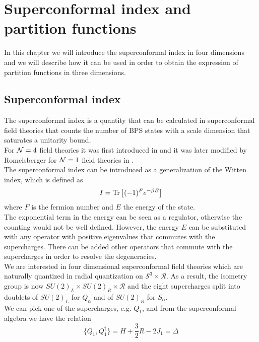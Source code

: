 

\chapter{Superconformal index and partition functions}

In this chapter we will introduce the superconformal index in four dimensions and we will describe how it can be used in order to obtain the expression of partition functions in three dimensions.\\
{\color{red}{ \LARGE Devo Aggiunger qualcosa}}


\section{Superconformal index}
The superconformal index is a quantity that can be calculated in superconformal field theories that counts the number of BPS states with a scale dimension that saturates a unitarity bound.\\
For $\mathcal{N}=4$ field theories it was first introduced in \cite{Kinney:2005ej}
and it was later modified by Romelsberger for $\mathcal{N}=1$ field theories in \cite{Romelsberger:2005eg}.\\
The superconformal index can be introduced as a generalization of the Witten index, which is defined as 
\begin{equation}
I = \mathrm{Tr } \,{ \left[   (-1)^F e^{-\beta E}\right]}
\end{equation}
where $F$ is the fermion number and $E$ the energy of the state.\\
The exponential term in the energy can be seen as a regulator, otherwise the counting would not be well defined.
However, the energy $E$ can be substituted with any operator with positive eigenvalues that commutes with the supercharges. 
There can be added other operators that commute with the supercharges in order to resolve the degeneracies.
\\
We are interested in four dimensional superconformal field theories which are naturally quantized in radial quantization on $\mathcal{S}^3 \times \mathcal{R}$. 
As a result, the isometry group is now $SU(2)_L \times SU(2)_R \times \mathcal{R}$ and the eight supercharges split into doublets of $SU(2)_L$ for $Q_{\alpha}$ and of $SU(2)_R$ for $S_{\alpha}$.\\
We can pick one of the supercharges, e.g. $Q_1$, and from the superconformal algebra we have the relation
\begin{equation}
 \{Q_1, Q_1^{\dagger} \} = H + \frac{3}{2} R - 2 J_1 = \Delta
 \end{equation} 
